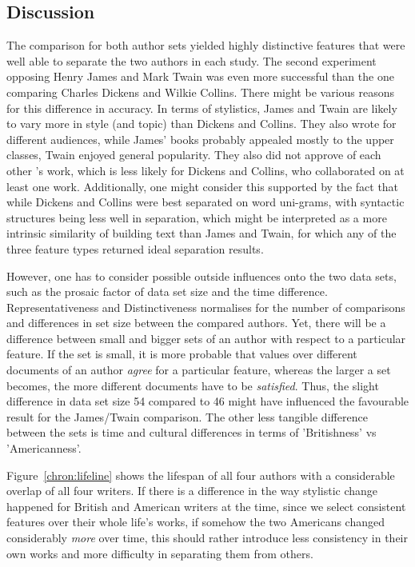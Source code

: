 \documentclass[a4paper,10pt,twoside,fleqn]{article}
\begin{document}
\subsection{Discussion}
The comparison for  both author sets yielded highly distinctive features
that were well able to separate the two authors in each study.
The second experiment opposing Henry James and Mark Twain was
even more successful than the one comparing Charles Dickens and Wilkie Collins.
There might be various reasons for this difference in accuracy.
In terms of stylistics, James and Twain are likely to vary more
in style (and topic) than Dickens and Collins.
They also wrote for different audiences, while James' books probably
appealed mostly to the upper classes, Twain enjoyed general
popularity. They also did not approve of each other 's work, which
is less likely for Dickens and Collins, who collaborated
on at least one work.
Additionally, one might consider this supported by the fact that
while Dickens and Collins were best separated on word uni-grams,
with syntactic structures being less well in separation, which
might be interpreted as a more intrinsic similarity of building
text than James and Twain, for which any of the three feature types
returned ideal separation results.

However, one has to consider possible outside influences
onto the two data sets, such as the prosaic factor of data set size
and the time difference.
Representativeness and Distinctiveness normalises for the number of
comparisons and differences in set size between the compared authors.
Yet, there will be a difference between small and bigger sets of an
author with respect to a particular feature. If the set is small,
it is more probable that values over different documents of
an author \emph{agree} for a particular feature, whereas the
larger a set becomes, the more different documents have to be
\emph{satisfied}.
Thus, the slight difference in data set size 54 compared to 46
might have influenced the favourable result for the James/Twain
comparison.
The other less tangible difference between the sets is time and
cultural differences in terms of 'Britishness' vs 'Americanness'.

Figure~\ref{chron:lifeline} shows the lifespan of all four authors
with a considerable overlap of all four writers.
If there is a difference in the way stylistic change happened
for British and American writers at the time, since
we select consistent features over their whole life's works,
if somehow the two Americans changed considerably \emph{more}
over time, this should rather introduce less consistency in
their own works and more difficulty in separating them from others.
\end{document}
